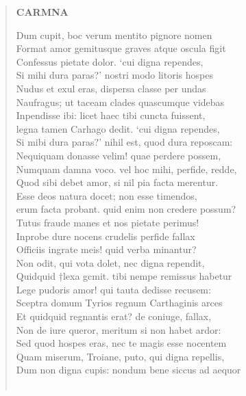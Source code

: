 \documentclass[11pt, a4paper]{report}
\begin{document}
\begin{verse}
     \marginpar{[118]} \begin{center} \textbf{CARMNA} \end{center}Dum cupit, boc verum mentito pignore nomen \\ Format amor gemitusque graves atque oscula figit \\ Confessus pietate dolor. ‘cui digna rependes, \\ Si mihi dura paras?’ nostri modo litoris hospes \\ Nudus et exul eras, dispersa classe per undas \\ Naufragus; ut taceam clades quascumque videbas \\ Inpendisse ibi: licet haec tibi cuncta fuissent, \\ legna tamen Carhago dedit. ‘cui digna rependes, \\ Si mibi dura paras?’ nihil est, quod dura reposcam: \\ Nequiquam donasse velim! quae perdere possem, \\ Numquam damna voco. vel hoc mihi, perfide, redde, \\ Quod sibi debet amor, si nil pia facta merentur. \\ Esse deos natura docet; non esse timendos, \\ erum facta probant. quid enim non credere possum? \\ Tutus fraude manes et nos pietate perimus! \\ Inprobe dure nocens crudelis perfide fallax \\ Officiis ingrate meis! quid verba minantur? \\ Non odit, qui vota dolet, nec digna rependit, \\ Quidquid †lexa gcmit. tibi nempe remissus habetur \\ Lege pudoris amor! qui tauta dedisse recusem: \\ Sceptra domum Tyrios regnum Carthaginis arces \\ Et quidquid regnantis erat? de coniuge, fallax, \\ Non de iure queror, meritum si non habet ardor: \\ Sed quod hospes eras, nec te magis esse nocentem \\ Quam miserum, Troiane, puto, qui digna repellis, \\ Dum non digna cupis: nondum bene siccus ad aequor \\ 
        ﻿\pagebreak 

\end{verse}
\end{document}
